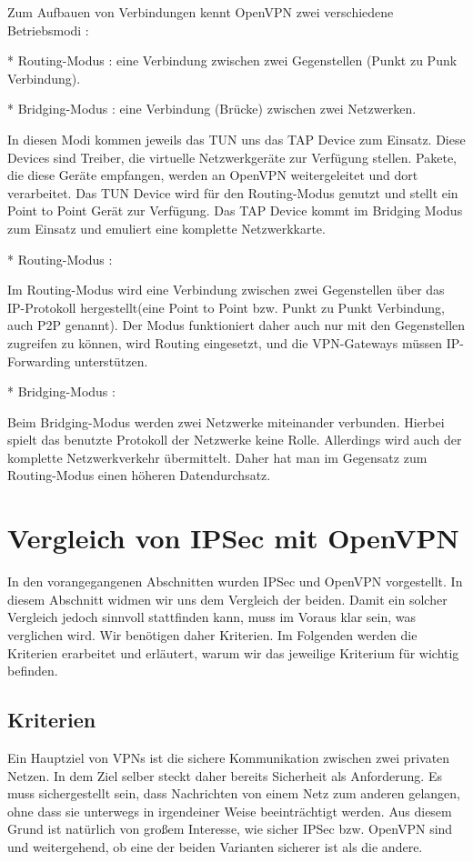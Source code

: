 \documentclass[12pt]{scrartcl}
\begin{document}
Zum Aufbauen von Verbindungen kennt OpenVPN zwei verschiedene Betriebsmodi :

* Routing-Modus : eine Verbindung zwischen zwei Gegenstellen (Punkt zu Punk Verbindung).

* Bridging-Modus : eine Verbindung (Brücke) zwischen zwei Netzwerken.

In diesen Modi kommen jeweils das TUN uns das TAP Device zum Einsatz. Diese Devices sind Treiber, die virtuelle Netzwerkgeräte zur Verfügung stellen. Pakete, die diese Geräte empfangen, werden an OpenVPN weitergeleitet und dort verarbeitet. Das TUN Device wird für den Routing-Modus genutzt und stellt ein Point to Point Gerät zur Verfügung. Das TAP Device kommt im Bridging Modus zum Einsatz und emuliert eine komplette Netzwerkkarte. 

* Routing-Modus :

Im Routing-Modus wird eine Verbindung zwischen zwei Gegenstellen über das IP-Protokoll hergestellt(eine Point to Point bzw. Punkt zu Punkt Verbindung, auch P2P genannt). Der  Modus funktioniert daher auch nur mit den Gegenstellen zugreifen zu können, wird Routing eingesetzt, und die VPN-Gateways müssen IP-Forwarding unterstützen.

* Bridging-Modus : 

Beim Bridging-Modus werden zwei Netzwerke miteinander verbunden. Hierbei spielt das benutzte Protokoll der Netzwerke keine Rolle. Allerdings wird auch der komplette Netzwerkverkehr übermittelt. Daher hat man im Gegensatz zum Routing-Modus einen höheren Datendurchsatz.

\section{Vergleich von IPSec mit OpenVPN}

In den vorangegangenen Abschnitten wurden IPSec und OpenVPN vorgestellt. In diesem Abschnitt widmen wir uns dem Vergleich der beiden. Damit ein solcher Vergleich jedoch sinnvoll stattfinden kann, muss im Voraus klar sein, was verglichen wird. Wir benötigen daher Kriterien. Im Folgenden werden die Kriterien erarbeitet und erläutert, warum wir das jeweilige Kriterium für wichtig befinden.

\subsection{Kriterien}
Ein Hauptziel von VPNs ist die sichere Kommunikation zwischen zwei privaten Netzen. In dem Ziel selber steckt daher bereits Sicherheit als Anforderung. Es muss sichergestellt sein, dass Nachrichten von einem Netz zum anderen gelangen, ohne dass sie unterwegs in irgendeiner Weise beeinträchtigt werden. Aus diesem Grund ist natürlich von großem Interesse, wie sicher IPSec bzw. OpenVPN sind und weitergehend, ob eine der beiden Varianten sicherer ist als die andere.
\end{document}
